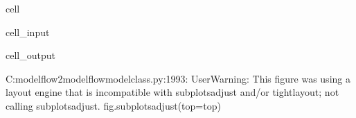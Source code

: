 \documentclass[letterpaper,10pt,english]{jupyterBook}
\begin{document}
\begin{sphinxuseclass}{cell}\begin{sphinxVerbatimInput}

\begin{sphinxuseclass}{cell_input}
\begin{sphinxVerbatim}[commandchars=\\\{\}]
\end{sphinxVerbatim}

\end{sphinxuseclass}\end{sphinxVerbatimInput}
\begin{sphinxVerbatimOutput}

\begin{sphinxuseclass}{cell_output}
\begin{sphinxVerbatim}[commandchars=\\\{\}]
C:\PYGZbs{}modelflow2\PYGZbs{}modelflow\PYGZbs{}modelclass.py:1993: UserWarning: This figure was using a layout engine that is incompatible with subplots\PYGZus{}adjust and/or tight\PYGZus{}layout; not calling subplots\PYGZus{}adjust.
  fig.subplots\PYGZus{}adjust(top=top)
\end{sphinxVerbatim}

\noindent{}

\end{sphinxuseclass}\end{sphinxVerbatimOutput}

\end{sphinxuseclass}
\end{document}
